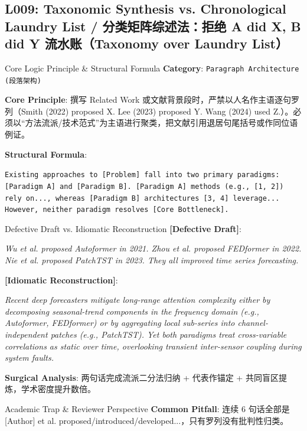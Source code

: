 \subsection{L009: Taxonomic Synthesis vs. Chronological Laundry List / 分类矩阵综述法：拒绝 A did X, B did Y 流水账（Taxonomy over Laundry List）}\label{sec:logic:L009}
\begin{ConceptBox}{Core Logic Principle \& Structural Formula}
\textbf{Category}: \texttt{Paragraph Architecture (段落架构)}\par\vspace{3pt}
\textbf{Core Principle}: 撰写 Related Work 或文献背景段时，严禁以人名作主语逐句罗列（Smith (2022) proposed X. Lee (2023) proposed Y. Wang (2024) used Z.）。必须以“方法流派/技术范式”为主语进行聚类，把文献引用退居句尾括号或作同位语例证。\par\vspace{4pt}
\textbf{Structural Formula}:\par\noindent\texttt{Existing approaches to [Problem] fall into two primary paradigms: [Paradigm A] and [Paradigm B]. [Paradigm A] methods (e.g., [1, 2]) rely on..., whereas [Paradigm B] architectures [3, 4] leverage... However, neither paradigm resolves [Core Bottleneck].}
\end{ConceptBox}
\begin{ExampleBox}{Defective Draft vs. Idiomatic Reconstruction}
\textbf{\color{TargetHighlight}[Defective Draft]}:\par\textit{Wu et al. proposed Autoformer in 2021. Zhou et al. proposed FEDformer in 2022. Nie et al. proposed PatchTST in 2023. They all improved time series forecasting.}\par\vspace{4pt}
\textbf{\color{AcadNavy}[Idiomatic Reconstruction]}:\par\textit{Recent deep forecasters mitigate long-range attention complexity either by decomposing seasonal-trend components in the frequency domain (e.g., Autoformer, FEDformer) or by aggregating local sub-series into channel-independent patches (e.g., PatchTST). Yet both paradigms treat cross-variable correlations as static over time, overlooking transient inter-sensor coupling during system faults.}\par\vspace{4pt}
\textbf{Surgical Analysis}: 两句话完成流派二分法归纳 + 代表作锚定 + 共同盲区提炼，学术密度提升数倍。
\end{ExampleBox}
\begin{TipBox}{Academic Trap \& Reviewer Perspective}
\textbf{Common Pitfall}: 连续 6 句话全部是 [Author] et al. proposed/introduced/developed...，只有罗列没有批判性归类。
\end{TipBox}
\vspace{6pt}
